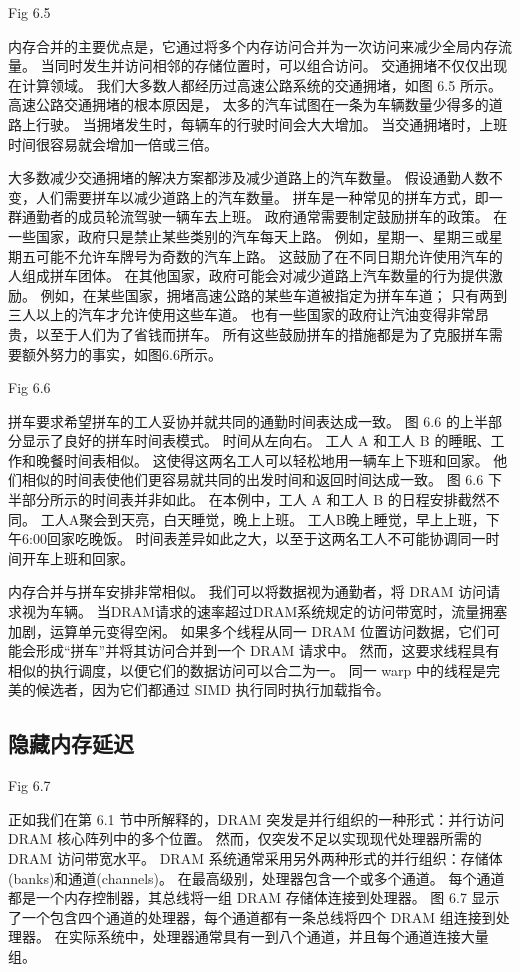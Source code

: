 {\color{red} Fig 6.5}

内存合并的主要优点是，它通过将多个内存访问合并为一次访问来减少全局内存流量。 
当同时发生并访问相邻的存储位置时，可以组合访问。 交通拥堵不仅仅出现在计算领域。 
我们大多数人都经历过高速公路系统的交通拥堵，如图 6.5 所示。 高速公路交通拥堵的根本原因是，
太多的汽车试图在一条为车辆数量少得多的道路上行驶。 当拥堵发生时，每辆车的行驶时间会大大增加。 
当交通拥堵时，上班时间很容易就会增加一倍或三倍。

大多数减少交通拥堵的解决方案都涉及减少道路上的汽车数量。 假设通勤人数不变，人们需要拼车以减少道路上的汽车数量。 
拼车是一种常见的拼车方式，即一群通勤者的成员轮流驾驶一辆车去上班。 政府通常需要制定鼓励拼车的政策。 
在一些国家，政府只是禁止某些类别的汽车每天上路。 例如，星期一、星期三或星期五可能不允许车牌号为奇数的汽车上路。 
这鼓励了在不同日期允许使用汽车的人组成拼车团体。 在其他国家，政府可能会对减少道路上汽车数量的行为提供激励。 
例如，在某些国家，拥堵高速公路的某些车道被指定为拼车车道； 只有两到三人以上的汽车才允许使用这些车道。 
也有一些国家的政府让汽油变得非常昂贵，以至于人们为了省钱而拼车。 
所有这些鼓励拼车的措施都是为了克服拼车需要额外努力的事实，如图6.6所示。

{\color{red} Fig 6.6}

拼车要求希望拼车的工人妥协并就共同的通勤时间表达成一致。 图 6.6 的上半部分显示了良好的拼车时间表模式。 
时间从左向右。 工人 A 和工人 B 的睡眠、工作和晚餐时间表相似。 这使得这两名工人可以轻松地用一辆车上下班和回家。 
他们相似的时间表使他们更容易就共同的出发时间和返回时间达成一致。 图 6.6 下半部分所示的时间表并非如此。 
在本例中，工人 A 和工人 B 的日程安排截然不同。 工人A聚会到天亮，白天睡觉，晚上上班。 
工人B晚上睡觉，早上上班，下午6:00回家吃晚饭。 时间表差异如此之大，以至于这两名工人不可能协调同一时间开车上班和回家。

内存合并与拼车安排非常相似。 我们可以将数据视为通勤者，将 DRAM 访问请求视为车辆。 
当DRAM请求的速率超过DRAM系统规定的访问带宽时，流量拥塞加剧，运算单元变得空闲。 
如果多个线程从同一 DRAM 位置访问数据，它们可能会形成“拼车”并将其访问合并到一个 DRAM 请求中。 
然而，这要求线程具有相似的执行调度，以便它们的数据访问可以合二为一。 
同一 warp 中的线程是完美的候选者，因为它们都通过 SIMD 执行同时执行加载指令。

\subsection{隐藏内存延迟}
{\color{red} Fig 6.7}

正如我们在第 6.1 节中所解释的，DRAM 突发是并行组织的一种形式：并行访问 DRAM 核心阵列中的多个位置。 
然而，仅突发不足以实现现代处理器所需的 DRAM 访问带宽水平。 
DRAM 系统通常采用另外两种形式的并行组织：存储体(banks)和通道(channels)。 
在最高级别，处理器包含一个或多个通道。 每个通道都是一个内存控制器，其总线将一组 DRAM 存储体连接到处理器。 
图 6.7 显示了一个包含四个通道的处理器，每个通道都有一条总线将四个 DRAM 组连接到处理器。 
在实际系统中，处理器通常具有一到八个通道，并且每个通道连接大量组。

